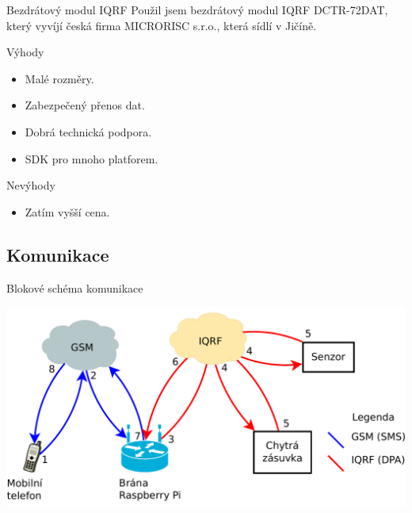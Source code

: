 \documentclass[11pt]{beamer}
\begin{document}
\begin{frame}{Bezdrátový modul IQRF}
  Použil jsem bezdrátový modul IQRF DCTR-72DAT, který vyvíjí česká firma MICRORISC s.r.o., která sídlí v Jičíně.
  \begin{exampleblock}{Výhody}
    \begin{itemize}
      \item Malé rozměry.
      \item Zabezpečený přenos dat.
      \item Dobrá technická podpora.
      \item SDK pro mnoho platforem.
    \end{itemize}
  \end{exampleblock}
  \begin{alertblock}{Nevýhody}
    \begin{itemize}
      \item Zatím vyšší cena.
    \end{itemize}
  \end{alertblock}
\end{frame}

\subsection{Komunikace}

\begin{frame}{Blokové schéma komunikace}
  \begin{center}
    \includegraphics[width = \textwidth]{../img/blokove-schema/komunikace.pdf}
  \end{center}
\end{frame}


%
\end{document}
